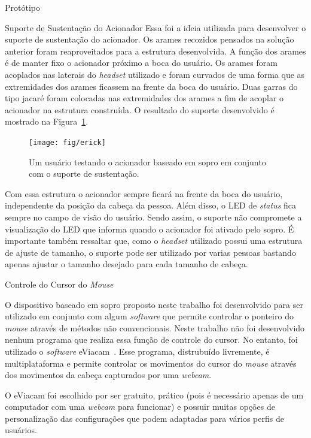 \begin{chapter}{Protótipo}
\begin{section}{Suporte de Sustentação do Acionador}
Essa foi a ideia utilizada para desenvolver o suporte de sustentação do
acionador. Os arames recozidos pensados na solução anterior foram reaproveitados
para a estrutura desenvolvida. A função dos arames é de manter fixo o acionador
próximo a boca do usuário. Os arames foram acoplados nas laterais do
\textit{headset} utilizado e foram curvados de uma forma que as extremidades
dos arames ficassem na frente da boca do usuário. Duas garras do tipo jacaré
foram colocadas nas extremidades  dos arames a fim de acoplar o acionador na
estrutura construída. O resultado do suporte desenvolvido é mostrado na
Figura~\ref{fig:suporte}. 

\begin{figure}[!h]
	\centering
	\begin{minipage}[c]{\textwidth}
	\centering
	\texttt{[image: fig/erick]}
	\caption{Um usuário testando o acionador baseado em sopro em conjunto com o
suporte de sustentação.} %
	\label{fig:suporte}
	\end{minipage}
\end{figure}

Com essa estrutura o acionador sempre ficará na frente da boca do usuário,
independente da posição da cabeça da pessoa. Além disso, o LED de
\textit{status} fica sempre no campo de visão do usuário. Sendo assim, o suporte
não compromete a visualização do LED que informa quando o acionador foi ativado
pelo sopro. É importante também ressaltar que, como o \textit{headset} utilizado
possui uma estrutura de ajuste de tamanho, o suporte pode ser utilizado por
varias pessoas bastando apenas ajustar o tamanho desejado para cada tamanho de
cabeça. 

\end{section}

\begin{section}{Controle do Cursor do \textit{Mouse}}

O dispositivo baseado em sopro proposto neste trabalho foi desenvolvido para ser
utilizado em conjunto com algum \textit{software} que permite controlar o
ponteiro do \textit{mouse} através de métodos não convencionais. Neste trabalho
não foi desenvolvido nenhum programa que realiza essa função de controle do
cursor. No entanto, foi utilizado o \textit{software} eViacam~\cite{eviacam}.
Esse programa, distrubuído livremente, é multiplataforma e permite controlar os
movimentos do cursor do \textit{mouse} através dos movimentos da cabeça
capturados por uma \textit{webcam}.

O eViacam foi escolhido por ser gratuito, prático (pois é necessário apenas de
um computador com uma \textit{webcam} para funcionar) e possuir muitas opções de
personalização das configurações que podem adaptadas para vários perfis de
usuários.  

 


\end{section}

\end{chapter}

